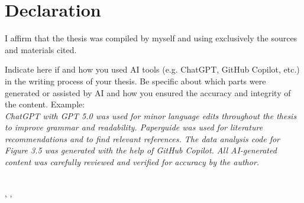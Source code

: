 \chapter*{Declaration} 

I affirm that the thesis was compiled by myself and using exclusively the sources and materials cited.

{
    \color{orange}
    Indicate here if and how you used AI tools (e.g. ChatGPT, GitHub Copilot, etc.) in the writing process of your thesis. 
    Be specific about which parts were generated or assisted by AI and how you ensured the accuracy and integrity of the content. Example:\\
    \emph{ChatGPT with GPT 5.0 was used for minor language edits throughout the thesis to improve grammar and readability. 
    Paperguide was used for literature recommendations and to find relevant references.
    The data analysis code for Figure 3.5 was generated with the help of GitHub Copilot. 
    All AI-generated content was carefully reviewed and verified for accuracy by the author.}
    
}

\vspace{2cm}
\makebox[10cm]{\hrulefill}\\
\noindent \Author, \City , \SubmissionMonth

